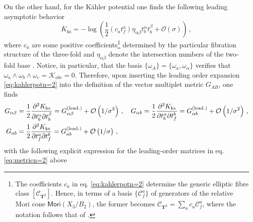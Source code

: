 On the other hand, for the K\"ahler potential one finds the following leading asymptotic behavior \cite{Lee:2019wij,Cota:2022maf}
%
\begin{equation}\label{eq:kahlerpotn=2}
	K_{\text{ks}}= - \log \left(\frac{1}{2} \left( c_a t^a_f\right)\eta_{\alpha \beta} t_b^{\alpha} t_b^{\beta} + \mathcal{O} (\sigma)\right)\, ,
\end{equation}
%
where $c_a$ are some positive coefficients\footnote{\label{fnote:ellipticclass}The coefficients $c_a$ in eq. \eqref{eq:kahlerpotn=2} determine the generic elliptic fibre class $[\mathcal{C}_{\mathbf{T}^2}]$. Hence, in terms of a basis $\lbrace \mathcal{C}_f^a \rbrace$ of generators of the relative Mori cone $\mathsf{Mori}(X_3/B_2)$, the former becomes $\mathcal{C}_{\mathbf{T}^2}= \sum_a c_a \mathcal{C}_f^a$, where the notation follows that of \cite{Cota:2022maf}.} determined by the particular fibration structure of the three-fold and $\eta_{\alpha \beta}$ denote the intersection numbers of the two-fold base \cite{Corvilain:2018lgw}. Notice, in particular, that the basis $\lbrace \omega_A\rbrace = \lbrace \omega_a, \omega_{\alpha} \rbrace$ verifies that $\omega_a \wedge \omega_b \wedge \omega_c = \mathcal{K}_{a b c}=0$. Therefore, upon inserting the leading order expansion \eqref{eq:kahlerpotn=2} into the definition of the vector multiplet metric $G_{A B}$, one finds
%
\begin{align}\label{eq:metricn=2}
	G_{\alpha \beta} &= \frac{1}{2} \frac{\partial^2 K_{\text{ks}}}{\partial t^{\alpha}_b \partial t^{\beta}_b} = G^{(\rm lead.)}_{\alpha \beta} + \mathcal{O}\left(1/\sigma^3 \right)\, , \quad G_{\alpha b} = \frac{1}{2} \frac{\partial^2 K_{\text{ks}}}{\partial t^{\alpha}_b \partial t^{b}_f} = G^{(\rm lead.)}_{\alpha b} + \mathcal{O}\left(1/\sigma^2 \right)\, ,\notag\\
	G_{a b} &= \frac{1}{2} \frac{\partial^2 K_{\text{ks}}}{\partial t^a_f \partial t^b_f} = G^{(\rm lead.)}_{a b} + \mathcal{O}\left(1/\sigma \right)\, ,
\end{align}
%
with the following explicit expression for the leading-order matrices in eq. \eqref{eq:metricn=2} above
%
